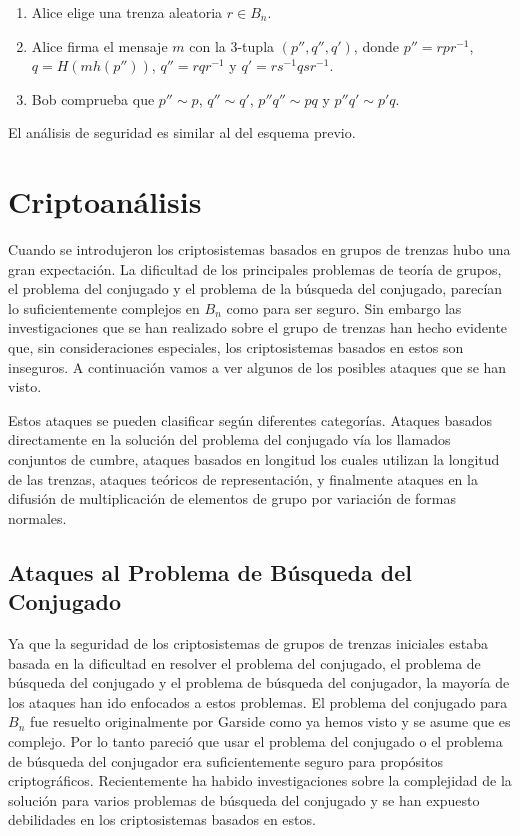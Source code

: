 \documentclass[12pt]{book}
\theoremstyle{definition}
\begin{document}
\begin{enumerate}
\item Alice elige una trenza aleatoria $r\in B_n$.
\item Alice firma el mensaje $m$ con la 3-tupla $(p'',q'',q')$, donde $p''=rpr^{-1}$, $q=H(mh(p''))$, $q''=rqr^{-1}$ y $q'=rs^{-1}qsr^{-1}$.
\item Bob comprueba que $p''\sim p$, $q''\sim q'$, $p''q''\sim pq$ y $p''q'\sim p'q$.
\end{enumerate}

El análisis de seguridad es similar al del esquema previo.

\chapter{Criptoanálisis}

Cuando se introdujeron los criptosistemas basados en grupos de trenzas hubo una gran expectación. La dificultad de los principales problemas de teoría de grupos, el problema del conjugado y el problema de la búsqueda del conjugado, parecían lo suficientemente complejos en $B_n$ como para ser seguro. Sin embargo las investigaciones que se han realizado sobre el grupo de trenzas han hecho evidente que, sin consideraciones especiales, los criptosistemas basados en estos son inseguros. A continuación vamos a ver algunos de los posibles ataques que se han visto.

Estos ataques se pueden clasificar según diferentes categorías. Ataques basados directamente en la solución del problema del conjugado vía los llamados conjuntos de cumbre, ataques basados en longitud los cuales utilizan la longitud de las trenzas, ataques teóricos de representación, y finalmente ataques en la difusión de multiplicación de elementos de grupo por variación de formas normales.

\section{Ataques al Problema de Búsqueda del Conjugado}

Ya que la seguridad de los criptosistemas de grupos de trenzas iniciales estaba basada en la dificultad en resolver el problema del conjugado, el problema de búsqueda del conjugado y el problema de búsqueda del conjugador, la mayoría de los ataques han ido enfocados a estos problemas. El problema del conjugado para $B_n$ fue resuelto originalmente por Garside como ya hemos visto y se asume que es complejo. Por lo tanto pareció que usar el problema del conjugado o el problema de búsqueda del conjugador era suficientemente seguro para propósitos criptográficos. Recientemente ha habido investigaciones sobre la complejidad de la solución para varios problemas de búsqueda del conjugado y se han expuesto debilidades en los criptosistemas basados en estos.
\end{document}
